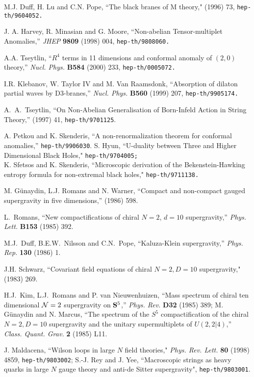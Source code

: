 \documentclass[12pt]{article}
\begin{document}
\begin{thebibliography}{99}
 M.J. Duff, H. Lu  and C.N. Pope,
``The black branes of M theory,"
 (1996) 73, {\tt  hep-th/9604052.}

J. A. Harvey, R. Minasian and G. Moore,
``Non-abelian Tensor-multiplet Anomalies,''
{\em JHEP} {\bf 9809} (1998) 004, 
{\tt  hep-th/9808060.}

A.A. Tseytlin,
``$R^4$ terms in 11 dimensions and conformal anomaly of $(2,0)$ theory,''
{\em Nucl. Phys.} {\bf B584} (2000) 233,
{\tt  hep-th/0005072.}

I.R. Klebanov, W. Taylor IV and M. Van Raamsdonk,
``Absorption of dilaton partial waves by D3-branes,''
{\em Nucl. Phys.} {\bf B560} (1999) 207,
{\tt hep-th/9905174.}

A.\ A.\ Tseytlin, ``On Non-Abelian Generalisation of Born-Infeld Action
in
  String Theory,''  (1997) 41, {\tt hep-th/9701125}.

A. Petkou and K. Skenderis, ``A non-renormalization theorem for
conformal anomalies,'' {\tt hep-th/9906030}.
S. Hyun,
``U-duality between Three and Higher Dimensional
Black Holes,"
{\tt hep-th/9704005;} \\
 K. Sfetsos  and  K. Skenderis, 
``Microscopic derivation  of the  Bekenstein-Hawking
entropy formula for non-extremal black holes,"
{\tt hep-th/9711138.}

M. G\" unaydin, L.J. Romans and N. Warner, ``Compact and non-compact
gauged supergravity in five dimensions,''
 (1986) 598.

L.~Romans, ``New compactifications of chiral $N=2$, $d=10$
supergravity,'' {\em Phys. Lett.} {\bf B153} (1985) 392.

M.J.~Duff, B.E.W.~Nilsson and C.N.~Pope, ``Kaluza-Klein
supergravity,'' {\em Phys. Rep.} {\bf 130} (1986) 1.

J.H. Schwarz, ``Covariant field equations of chiral $N=2, 
D=10$ supergravity,"
 (1983) 269.

H.J.~Kim, L.J.~Romans and P. van Nieuwenhuizen,
``Mass spectrum of chiral ten dimensional ${\cal N}=2$
supergravity on ${\bf S}^5$,'' {\em Phys. Rev.} {\bf D32} (1985) 389;
M. G\" unaydin and N. Marcus,
``The spectrum of the $S^5$ compactification of the chiral 
$N=2, D = 10$ supergravity and the unitary
supermultiplets of $U(2, 2|4)$,''
{\em Class. Quant. Grav.} {\bf 2} (1985) L11.

J. Maldacena, ``Wilson loops in large $N$
 field theories," {\it Phys. Rev. Lett.} {\bf 80} (1998) 4859,
 {\tt hep-th/9803002};
S.-J. Rey and J. Yee, ``Macroscopic strings as heavy quarks 
in large $N$ gauge theory and anti-de Sitter supergravity",
{\tt hep-th/9803001}.


\end{thebibliography}
\end{document}
